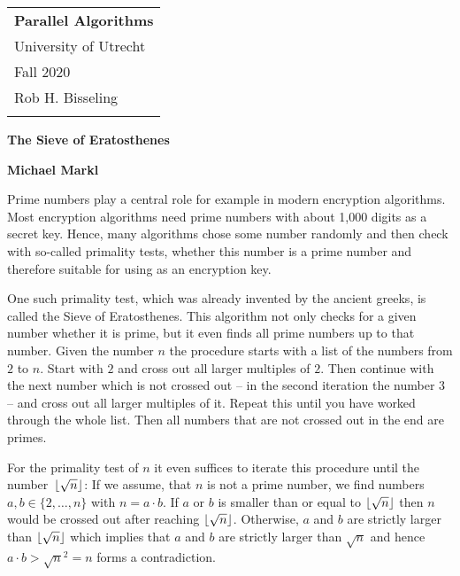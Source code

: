 \documentclass[a4paper,12pt]{article}
\DeclarePairedDelimiter\floor{\lfloor}{\rfloor}
\begin{document}
\thispagestyle{empty}

\begin{tabular}{p{15.5cm}} %
{\large \bf Parallel Algorithms} \\
University of Utrecht \\ Fall 2020  \\ Rob H. Bisseling\\
\hline
\\
\end{tabular}

\vspace*{0.3cm}
\begin{center}
	{\Large \bf The Sieve of Eratosthenes}
	\vspace{2mm}
	
	{\bf Michael Markl}
\end{center}  
\vspace{0.4cm}

Prime numbers play a central role for example in modern encryption algorithms.
Most encryption algorithms need prime numbers with about 1,000 digits as a secret key.
Hence, many algorithms chose some number randomly and then check with so-called primality tests, whether this number is a prime number and therefore suitable for using as an encryption key.

One such primality test, which was already invented by the ancient greeks, is called the Sieve of Eratosthenes.
This algorithm not only checks for a given number whether it is prime, but it even finds all prime numbers up to that number.
Given the number $n$ the procedure starts with a list of the numbers from $2$ to $n$.
Start with $2$ and cross out all larger multiples of $2$.
Then continue with the next number which is not crossed out  -- in the second iteration the number $3$ -- and cross out all larger multiples of it.
Repeat this until you have worked through the whole list.
Then all numbers that are not crossed out in the end are primes.

For the primality test of $n$ it even suffices to iterate this procedure until the number~$\floor{\sqrt{n}}$: If we assume, that $n$ is not a prime number, we find numbers $a,b\in\{2, \dots, n\}$ with $n=a\cdot b$.
If $a$ or $b$ is smaller than or equal to $\floor{\sqrt{n}}$ then $n$ would be crossed out after reaching $\floor{\sqrt{n}}$.
Otherwise, $a$ and $b$ are strictly larger than $\floor{\sqrt{n}}$ which implies that $a$ and $b$ are strictly larger than $\sqrt{n}$ and hence $a\cdot b > \sqrt{n}^2 = n$ forms a contradiction.
\end{document}
